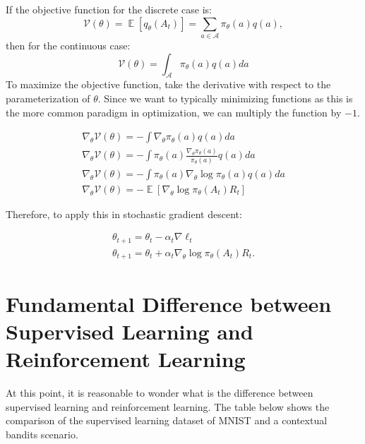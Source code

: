 \documentclass[twoside]{article}
\DeclareMathOperator{\E}{\mathbb{E}}
\begin{document}
If the objective function for the discrete case is:
\begin{equation}
    \mathcal{V}(\theta) = \E[q_\theta(A_t)] = \sum_{a\in\mathcal{A}} \pi_\theta(a) q(a),
\end{equation}
then for the continuous case:
\begin{equation}
    \mathcal{V}(\theta) = \int_{\mathcal{A}} \pi_\theta(a)q(a)da
\end{equation}
To maximize the objective function, take the derivative with respect to the parameterization of $\theta$. Since we want to typically minimizing functions as this is the more common paradigm in optimization, we can multiply the function by $-1$.

\begin{equation}
    \begin{split}
    \nabla_\theta\mathcal{V}(\theta) = -\int  \nabla_\theta\pi_\theta(a)q(a)da \\ 
    \nabla_\theta\mathcal{V}(\theta) = -\int  \pi_\theta(a)\frac{\nabla_\theta\pi_\theta(a)}{\pi_\theta(a)}q(a)da \\
    \nabla_\theta\mathcal{V}(\theta) = -\int  \pi_\theta(a)\nabla_\theta \log\pi_\theta(a)q(a)da
    \\
    \nabla_\theta\mathcal{V}(\theta) = -\E[\nabla_\theta \log\pi_\theta(A_t)R_t]
    \end{split}
\end{equation}

Therefore, to apply this in stochastic gradient descent:

\begin{equation}
    \begin{split}
        \theta_{t+1} = \theta_t - \alpha_t\nabla \ell_t \\
        \theta_{t+1} = \theta_t + \alpha_t\nabla_\theta \log\pi_\theta(A_t)R_t.
    \end{split}
\end{equation}

\section{Fundamental Difference between Supervised Learning and Reinforcement Learning}

At this point, it is reasonable to wonder what is the difference between supervised learning and reinforcement learning. The table below shows the comparison of the supervised learning dataset of MNIST and a contextual bandits scenario.
\end{document}
